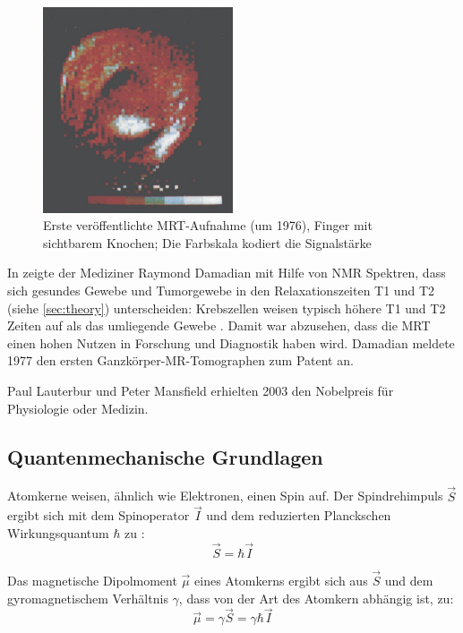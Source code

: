 \begin{figure}[H]
	\centering
	\includegraphics[width=0.5\textwidth]{img/ext/mansfieldFinger.png}
	\caption[Erste MRT-Aufnahme von Mansfield]{Erste veröffentlichte MRT-Aufnahme (um 1976), Finger mit sichtbarem Knochen; Die Farbskala kodiert die Signalstärke \cite{Mansfield1977a}}
	\label{fig:mansfieldFinger}
\end{figure}

In \cite{Damadian1971} zeigte der Mediziner Raymond Damadian mit Hilfe von NMR Spektren, dass sich gesundes Gewebe und Tumorgewebe in den Relaxationszeiten T1 und T2 (siehe \autoref{sec:theory}) unterscheiden: Krebszellen weisen typisch höhere T1 und T2 Zeiten auf als das umliegende Gewebe \cite{Damadian1971}. Damit war abzusehen, dass die MRT einen hohen Nutzen in Forschung und Diagnostik haben wird. Damadian meldete 1977 den ersten Ganzkörper-MR-Tomographen zum Patent an.

Paul Lauterbur und Peter Mansfield erhielten 2003 den Nobelpreis für Physiologie oder Medizin.

\subsection{Quantenmechanische Grundlagen}
\label{sec:theory}
\label{sec:nmrTheory}
Atomkerne weisen, ähnlich wie Elektronen, einen Spin auf. Der Spindrehimpuls $\vec{S}$ ergibt sich mit dem Spinoperator $\vec{I}$ und dem reduzierten Planckschen Wirkungsquantum $\hbar$ zu \cite[S.~55]{Nishimura1996}:
\begin{equation}
	\vec{S}=\hbar \vec{I}
\end{equation}

Das magnetische Dipolmoment $\vec{\mu}$ eines Atomkerns ergibt sich aus $\vec{S}$ und dem gyromagnetischem Verhältnis $\gamma$, dass von der Art des Atomkern abhängig ist, zu:
\begin{equation}
	\vec{\mu}=\gamma \vec{S} = \gamma \hbar \vec{I}
\end{equation}

